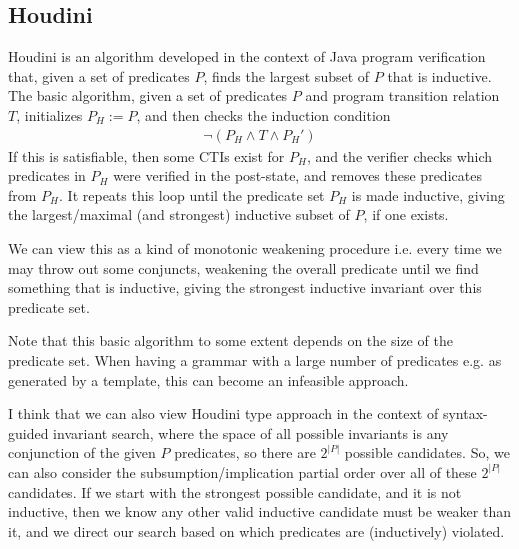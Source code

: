 \documentclass[10pt,a4paper]{article}
\begin{document}
\subsection*{Houdini}

Houdini \cite{2001leinoflanagan} is an algorithm developed in the context of Java program verification that, given a set of predicates $P$, finds the largest subset of $P$ that is inductive. The basic algorithm, given a set of predicates $P$ and program transition relation $T$, initializes $P_H := P$, and then checks the induction condition
\begin{align*}
    \neg (P_H \wedge T \wedge P_H')
\end{align*}
If this is satisfiable, then some CTIs exist for $P_H$, and the verifier checks which predicates in $P_H$ were verified in the post-state, and removes these predicates from $P_H$. It repeats this loop until the predicate set $P_H$ is made inductive, giving the largest/maximal (and strongest) inductive subset of $P$, if one exists.

We can view this as a kind of monotonic weakening procedure i.e. every time we may throw out some conjuncts, weakening the overall predicate until we find something that is inductive, giving the strongest inductive invariant over this predicate set.

Note that this basic algorithm to some extent depends on the size of the predicate set. When having a grammar with a large number of predicates e.g. as generated by a template, this can become an infeasible approach.

I think that we can also view Houdini type approach in the context of syntax-guided invariant search, where the space of all possible invariants is any conjunction of the given $P$ predicates, so there are $2^{|P|}$ possible candidates. So, we can also consider the subsumption/implication partial order over all of these $2^{|P|}$ candidates. If we start with the strongest possible candidate, and it is not inductive, then we know any other valid inductive candidate must be weaker than it, and we direct our search based on which predicates are (inductively) violated.




\end{document}
